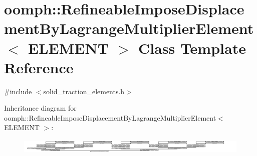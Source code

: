 \hypertarget{classoomph_1_1RefineableImposeDisplacementByLagrangeMultiplierElement}{}\section{oomph\+:\+:Refineable\+Impose\+Displacement\+By\+Lagrange\+Multiplier\+Element$<$ E\+L\+E\+M\+E\+NT $>$ Class Template Reference}
\label{classoomph_1_1RefineableImposeDisplacementByLagrangeMultiplierElement}


{\ttfamily \#include $<$solid\+\_\+traction\+\_\+elements.\+h$>$}

Inheritance diagram for oomph\+:\+:Refineable\+Impose\+Displacement\+By\+Lagrange\+Multiplier\+Element$<$ E\+L\+E\+M\+E\+NT $>$\+:\begin{figure}[H]
\begin{center}
\leavevmode
\includegraphics[height=0.736288cm]{classoomph_1_1RefineableImposeDisplacementByLagrangeMultiplierElement}
\end{center}
\end{figure}
